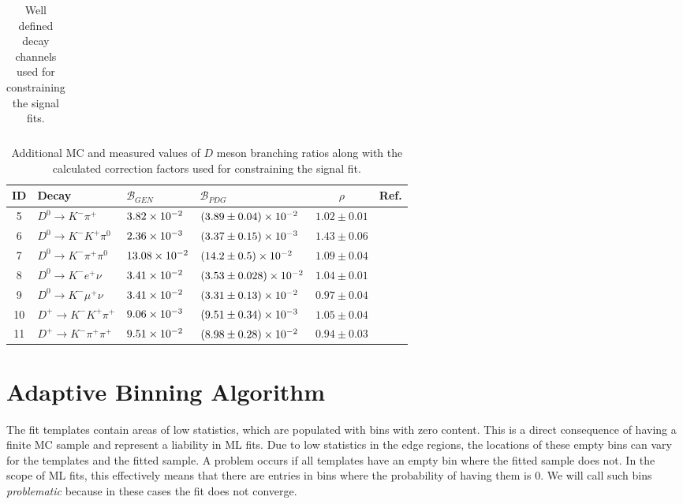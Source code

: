\begin{table}[H]
\begin{tabular}{l|l|l|l|l}
	\end{tabular}
	\captionsetup{width=0.8\linewidth}
	\caption{Well defined decay channels used for constraining the signal fits.}
	\label{tab:sig_constraint_table}
\end{table}

\begin{table}[H]
	\centering
	\begin{tabular}{c|l|l|l|c|c}
		ID & Decay & $\mathcal{B}_{GEN}$ & $\mathcal{B}_{PDG}$ & $\rho$ & Ref. \\ 
		\toprule
		5 &    $D^0 \to K^-\pi^+$ & $3.82\times 10^{-2}$ & $(3.89\pm0.04)\times 10^{-2}$ & $1.02 \pm 0.01$ & \multirow{7}{*}{ \cite{tanabashi2018review}} \\
		6 & $D^0 \to K^-K^+\pi^0$ & $2.36\times 10^{-3}$ & $(3.37\pm0.15)\times 10^{-3}$ & $1.43 \pm 0.06$ & \\
		7 & $D^0 \to K^-\pi^+\pi^0$ & $13.08\times 10^{-2}$ & $(14.2\pm0.5)\times 10^{-2}$ & $1.09 \pm 0.04$ &  \\
		8 & $D^0 \to K^-e^+\nu$ & $3.41\times 10^{-2}$ & $(3.53\pm0.028)\times 10^{-2}$ & $1.04 \pm 0.01$ &  \\
		9 & $D^0 \to K^-\mu^+\nu$ & $3.41\times 10^{-2}$ & $(3.31\pm0.13)\times 10^{-2}$ & $0.97 \pm 0.04$ &  \\
		10 & $D^+ \to K^-K^+\pi^+$ & $9.06\times 10^{-3}$ & $(9.51\pm0.34)\times 10^{-3}$ & $1.05 \pm 0.04$ &  \\
		11 & $D^+ \to K^-\pi^+\pi^+$ & $9.51\times 10^{-2}$ & $(8.98\pm0.28)\times 10^{-2}$ & $0.94 \pm 0.03$ &  \\
		\bottomrule
	\end{tabular}
	\captionsetup{width=0.8\linewidth}
	\caption{Additional MC and measured values of $D$ meson branching ratios along with the calculated correction factors used for constraining the signal fit.}
	\label{tab:sig_br_constraint_table}
\end{table}

\section{Adaptive Binning Algorithm}\label{sec:adaptive-binning-algorithm}

The fit templates contain areas of low statistics, which are populated with bins with zero content. This is a direct consequence of having a finite MC sample and represent a liability in ML fits. Due to low statistics in the edge regions, the locations of these empty bins can vary for the templates and the fitted sample. A problem occurs if all templates have an empty bin where the fitted sample does not. In the scope of ML fits, this effectively means that there are entries in bins where the probability of having them is $0$. We will call such bins \textit{problematic} because in these cases the fit does not converge.

